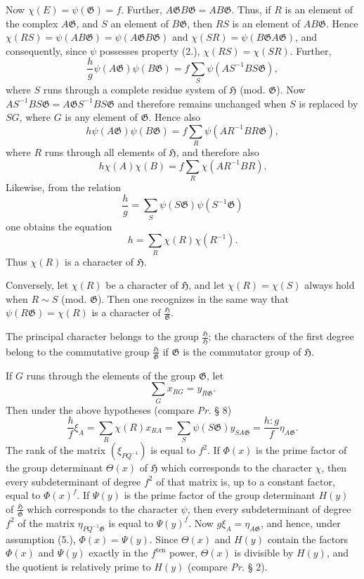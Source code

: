 \documentclass[11pt]{article}
\newcommand{\Hgrp}{\mathfrak{H}}
\newcommand{\Ggrp}{\mathfrak{G}}
\newcommand{\ten}{\mathrm{ten}}
\begin{document}
Now $\chi(E)=\psi(\Ggrp)=f$. Further, $A\Ggrp B\Ggrp=AB\Ggrp$. Thus, if $R$ is an element of the complex $A\Ggrp$, and $S$ an element of $B\Ggrp$, then $RS$ is an element of $AB\Ggrp$. Hence $\chi(RS)=\psi(AB\Ggrp)=\psi(A\Ggrp B\Ggrp)$ and $\chi(SR)=\psi(B\Ggrp A\Ggrp)$, and consequently, since $\psi$ possesses property (2.), $\chi(RS)=\chi(SR)$. Further,
\[
\frac{h}{g}\psi(A\Ggrp)\psi(B\Ggrp)=f\sum_S\psi(AS^{-1}BS\Ggrp),
\]
where $S$ runs through a complete residue system of $\Hgrp$ (mod. $\Ggrp$). Now $AS^{-1}BS\Ggrp=A\Ggrp S^{-1}BS\Ggrp$ and therefore remains unchanged when $S$ is replaced by $SG$, where $G$ is any element of $\Ggrp$. Hence also
\[
h\psi(A\Ggrp)\psi(B\Ggrp)=f\sum_R\psi(AR^{-1}BR\Ggrp),
\]
where $R$ runs through all elements of $\Hgrp$, and therefore also
\[
h\chi(A)\chi(B)=f\sum_R\chi(AR^{-1}BR).
\]
Likewise, from the relation
\[
\frac{h}{g}=\sum_S\psi(S\Ggrp)\psi(S^{-1}\Ggrp)
\]
one obtains the equation
\[
h=\sum_R\chi(R)\chi(R^{-1}).
\]
Thus $\chi(R)$ is a character of $\Hgrp$.

Conversely, let $\chi(R)$ be a character of $\Hgrp$, and let $\chi(R)=\chi(S)$ always hold when $R\sim S$ (mod. $\Ggrp$). Then one recognizes in the same way that $\psi(R\Ggrp)=\chi(R)$ is a character of $\frac{\Hgrp}{\Ggrp}$.

The principal character belongs to the group $\frac{\Hgrp}{\Hgrp}$; the characters of the first degree belong to the commutative group $\frac{\Hgrp}{\Ggrp}$ if $\Ggrp$ is the commutator group of $\Hgrp$.

If $G$ runs through the elements of the group $\Ggrp$, let
\begin{equation}\tag{5.}
\sum_G x_{RG}=y_{R\Ggrp}.
\end{equation}
Then under the above hypotheses (compare \emph{Pr.} § 8)
\[
\frac{h}{f}\xi_A=\sum_R\chi(R)x_{RA}=\sum_S\psi(S\Ggrp)y_{SA\Ggrp}=\frac{h:g}{f}\eta_{A\Ggrp}.
\]
The rank of the matrix $(\xi_{PQ^{-1}})$ is equal to $f^2$. If $\Phi(x)$ is the prime factor of the group determinant $\Theta(x)$ of $\Hgrp$ which corresponds to the character $\chi$, then every subdeterminant of degree $f^2$ of that matrix is, up to a constant factor, equal to $\Phi(x)^f$. If $\Psi(y)$ is the prime factor of the group determinant $H(y)$ of $\frac{\Hgrp}{\Ggrp}$ which corresponds to the character $\psi$, then every subdeterminant of degree $f^2$ of the matrix $\eta_{PQ^{-1}\Ggrp}$ is equal to $\Psi(y)^f$. Now $g\xi_A=\eta_{A\Ggrp}$, and hence, under assumption (5.), $\Phi(x)=\Psi(y)$. Since $\Theta(x)$ and $H(y)$ contain the factors $\Phi(x)$ and $\Psi(y)$ exactly in the $f^{\ten}$ power, $\Theta(x)$ is divisible by $H(y)$, and the quotient is relatively prime to $H(y)$ (compare \emph{Pr.} § 2).
\end{document}
